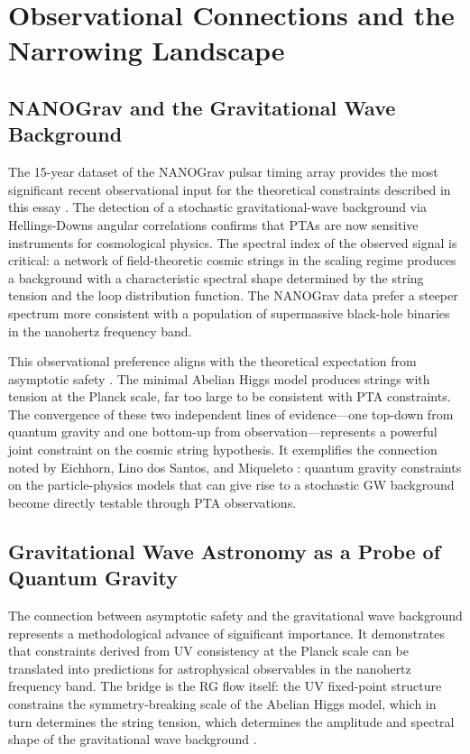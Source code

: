 \documentclass[12pt,a4paper]{article}
\begin{document}
\section{Observational Connections and the Narrowing Landscape}

\subsection{NANOGrav and the Gravitational Wave Background}

The 15-year dataset of the NANOGrav pulsar timing array provides the most
significant recent observational input for the theoretical constraints described
in this essay \cite{NANOGrav2023}. The detection of a stochastic
gravitational-wave background via Hellings-Downs angular correlations confirms
that PTAs are now sensitive instruments for cosmological physics. The spectral
index of the observed signal is critical: a network of field-theoretic cosmic
strings in the scaling regime produces a background with a characteristic
spectral shape determined by the string tension and the loop distribution
function. The NANOGrav data prefer a steeper spectrum more consistent with a
population of supermassive black-hole binaries in the nanohertz frequency band.

This observational preference aligns with the theoretical expectation from
asymptotic safety \cite{EichhornLinoMiqueleto2023}. The minimal Abelian Higgs
model produces strings with tension at the Planck scale, far too large to be
consistent with PTA constraints. The convergence of these two independent lines
of evidence---one top-down from quantum gravity and one bottom-up from
observation---represents a powerful joint constraint on the cosmic string
hypothesis. It exemplifies the connection noted by Eichhorn, Lino dos Santos,
and Miqueleto \cite{EichhornLinoMiqueleto2023}: quantum gravity constraints
on the particle-physics models that can give rise to a stochastic GW background
become directly testable through PTA observations.

\subsection{Gravitational Wave Astronomy as a Probe of Quantum Gravity}

The connection between asymptotic safety and the gravitational wave background
represents a methodological advance of significant importance. It demonstrates
that constraints derived from UV consistency at the Planck scale can be
translated into predictions for astrophysical observables in the nanohertz
frequency band. The bridge is the RG flow itself: the UV fixed-point structure
constrains the symmetry-breaking scale of the Abelian Higgs model, which in
turn determines the string tension, which determines the amplitude and spectral
shape of the gravitational wave background \cite{EichhornLinoMiqueleto2023}.
\end{document}
